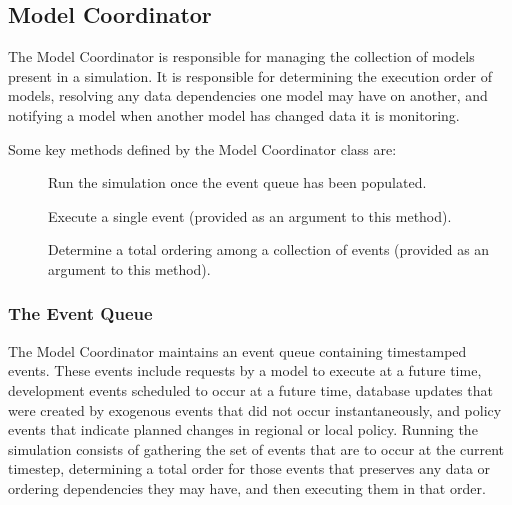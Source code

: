 
\subsection{Model Coordinator}
\label{sec:ModelCoordinator}

The Model Coordinator is responsible for managing the collection of models
present in a simulation.  It is responsible for determining the execution
order of models, resolving any data dependencies one model may have on
another, and notifying a model when another model has changed data it is
monitoring.

Some key methods defined by the Model Coordinator class are:

\begin{description}

\item[] Run the simulation once the event queue has been
populated.

\item[] Execute a single event (provided as an argument
to this method).

\item[] Determine a total ordering among a collection of
events (provided as an argument to this method).

\end{description}

\subsubsection{The Event Queue}
\label{sec:event-queue}

The Model Coordinator maintains an event queue containing timestamped
events.  These events include requests by a model to execute at a future
time, development events scheduled to occur at a future time, database
updates that were created by exogenous events that did not occur
instantaneously, and policy events that indicate planned changes in
regional or local policy.  Running the simulation consists of gathering the
set of events that are to occur at the current timestep, determining a
total order for those events that preserves any data or ordering
dependencies they may have, and then executing them in that order.

